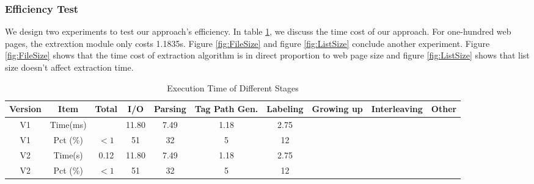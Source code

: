 
\subsubsection{Efficiency Test}
We design two experiments to test our approach's efficiency. In table \ref{tab:TimeCostDistribution}, we discuss the time cost of our approach. For one-hundred web pages, the extrextion module only costs 1.1835s. Figure \ref{fig:FileSize} and figure \ref{fig:ListSize} conclude another experiment. Figure \ref{fig:FileSize} shows that the time cost of extraction algorithm is in direct proportion to web page size and figure \ref{fig:ListSize} shows that list size doesn't affect extraction time.

\begin{table}[tb]
\centering
\caption{Execution Time of Different Stages}
\label{tab:TimeCostDistribution}
\begin{tabular}{|c|c||c|c|c|c|c|c|c|c|} 
\hline
Version & Item & Total & I/O & Parsing & Tag Path Gen. & Labeling & Growing up & Interleaving & Other\\\hline
V1 & Time(ms) &  & 11.80 & 7.49 & 1.18 & 2.75\\\hline
V1 & Pct (\%) & $<1$ & 51 & 32 & 5 & 12\\\hline
V2 & Time(s) & 0.12 & 11.80 & 7.49 & 1.18 & 2.75\\\hline
V2 & Pct (\%) & $<1$ & 51 & 32 & 5 & 12\\\hline
\end{tabular}
\end{table}


